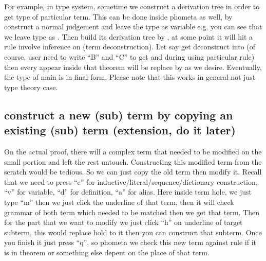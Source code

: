\documentclass[master.tex]{subfiles}
\begin{document}
For example, in type system, sometime we construct a derivation tree in order to get type of particular term. This can be done inside phometa as well, by construct a normal judgement and leave the type as variable e.g.  you can see that we leave type as . Then build its derivation tree by \kTheorem, at some point it will hit a rule involve inference on  (term deconstruction). Let say  get deconstruct into  (of course, user need to write ``B'' and ``C'' to get  and  during using particular rule) then every  appear inside that theorem will be replace by  as we desire. Eventually, the type of main is in final form. Please note that this works in general not just type theory case.

\subsection{construct a new (sub) term by copying an existing (sub) term (extension, do it later)}

On the actual proof, there will a complex term that needed to be modified on the
small portion and left the rest untouch. Constructing this modified term from
the scratch would be tedious. So we can just copy the old term then modify it.
Recall that we need to press ``c'' for inductive/literal/sequence/dictionary
construction, ``v'' for variable, ``d'' for definition, ``a'' for alias. Here
inside term hole, we just type ``m'' then we just click the underline of that
term, then it will check grammar of both term which needed to be matched then we
get that term. Then for the part that we want to modify we just click ``h'' on
underline of target subterm, this would replace hold to it then you can
construct that subterm. Once you finish it just press ``q'', so phometa we check
this new term against rule if it is in theorem or something else depent on the
place of that term.
\end{document}

